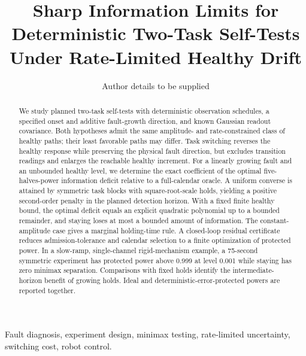 \documentclass[journal]{IEEEtran}
\theoremstyle{definition}\newtheorem{definition}{Definition}
\theoremstyle{remark}\newtheorem{remark}{Remark}
\begin{document}
\title{Sharp Information Limits for Deterministic Two-Task Self-Tests Under Rate-Limited Healthy Drift}
\author{Author details to be supplied}
\maketitle
\begin{abstract}
We study planned two-task self-tests with deterministic observation schedules, a specified onset and additive fault-growth direction, and known Gaussian readout covariance. Both hypotheses admit the same amplitude- and rate-constrained class of healthy paths; their least favorable paths may differ. Task switching reverses the healthy response while preserving the physical fault direction, but excludes transition readings and enlarges the reachable healthy increment. For a linearly growing fault and an unbounded healthy level, we determine the exact coefficient of the optimal five-halves-power information deficit relative to a full-calendar oracle. A uniform converse is attained by symmetric task blocks with square-root-scale holds, yielding a positive second-order penalty in the planned detection horizon. With a fixed finite healthy bound, the optimal deficit equals an explicit quadratic polynomial up to a bounded remainder, and staying loses at most a bounded amount of information. The constant-amplitude case gives a marginal holding-time rule. A closed-loop residual certificate reduces admission-tolerance and calendar selection to a finite optimization of protected power. In a slow-ramp, single-channel rigid-mechanism example, a 75-second symmetric experiment has protected power above 0.999 at level 0.001 while staying has zero minimax separation. Comparisons with fixed holds identify the intermediate-horizon benefit of growing holds. Ideal and deterministic-error-protected powers are reported together.
\end{abstract}
\begin{IEEEkeywords}
Fault diagnosis, experiment design, minimax testing, rate-limited uncertainty, switching cost, robot control.
\end{IEEEkeywords}






\end{document}
